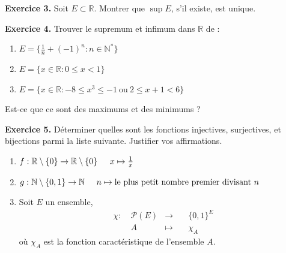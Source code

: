 \documentclass[a4paper, 10pt]{report}
\begin{document}
	\vspace{5mm}
	\noindent
	\textbf{Exercice 3.} Soit $E \subset \mathbb{R}$. Montrer que
	$\sup{E}$, s'il existe, est unique.
	
	\vspace{5mm}
	\noindent
	\textbf{Exercice 4.} Trouver le supremum et infimum dans $\mathbb{R}$
	de :
	\begin{enumerate}[label=(\roman*)]
		\item $E = \{\frac{1}{n} + (-1)^n : n \in \mathbb{N}^*\}$
		\item $E = \{x \in \mathbb{R} : 0 \leq x < 1\}$
		\item $E = \{x \in \mathbb{R} : -8 \leq x^3 \leq -1\
			\text{ou}\ 2 \leq x + 1 < 6\}$	
	\end{enumerate}
	Est-ce que ce sont des maximums et des minimums ?
	
	\vspace{5mm}
	\noindent
	\textbf{Exercice 5.} Déterminer quelles sont les fonctions
	injectives, surjectives, et bijections parmi la liste suivante.
	Justifier vos affirmations.
	\begin{enumerate}[label=(\roman*)]
		\item $f : \mathbb{R} \setminus \{0\} \to
			\mathbb{R} \setminus \{0\}\\
		\phantom{f :\ } x \mapsto \frac{1}{x}$
		\item $g : \mathbb{N} \setminus \{0, 1\} \to \mathbb{N}\\
		\phantom{g :\ } n \mapsto \text{le plus petit nombre premier
			divisant}\ n$
		\item Soit $E$ un ensemble,
		\[\begin{aligned}
			\chi :\ & \mathcal{P}(E) &\to \quad &\{0, 1\}^E\\
			&A &\mapsto \quad &\chi_A
		\end{aligned}\]
		où $\chi_A$ est la fonction caractéristique de l'ensemble $A$.
	\end{enumerate}
	
\end{document}
